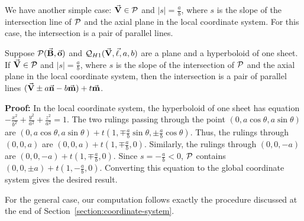      We have another simple case: $\vec{\bf V}\in{\cal P}$ and $|s|=\frac{a}{b}$,
where $s$ is the slope of the intersection line of ${\cal P}$ and the axial
plane in the local coordinate system.  For this case, the intersection is
a pair of parallel lines.

\begin{lemma}
\label{lemma:hy1-equal-slope}
     Suppose ${\cal P}(\vec{\bf B},\vec{\bf o})$ and
${\cal Q}_{H1}(\vec{\bf V},\vec{\bf \ell},a,b)$ are a plane and a hyperboloid of
one sheet.  If $\vec{\bf V}\in{\cal P}$ and $|s|=\frac{a}{b}$, where $s$ is the
slope of the intersection of ${\cal P}$ and the axial plane in the local
coordinate system, then the intersection is a pair of parallel lines
$(\vec{\bf V}\pm a\vec{\bf n}-b\vec{\bf m})+t\vec{\bf m}$.
\end{lemma}
{\bf Proof:}  In the local coordinate system, the hyperboloid of one sheet
has equation $-\frac{x^2}{b^2}+\frac{y^2}{a^2}+\frac{z^2}{a^2}=1$.
The two rulings passing through the point
$(0,a\cos\theta,a\sin\theta)$ are $(0,a\cos\theta,a\sin\theta)+t
\left(1,\mp\frac{a}{b}\sin\theta,\pm\frac{a}{b}\cos\theta\right)$.
Thus, the rulings through
$(0,0,a)$ are $(0,0,a)+t\left(1,\mp\frac{a}{b},0\right)$.  Similarly, the
rulings through $(0,0,-a)$ are $(0,0,-a)+t\left(1,\mp\frac{a}{b},0\right)$.
Since $s=-\frac{a}{b}<0$, ${\cal P}$ contains
$(0,0,\pm a)+t\left(1,-\frac{a}{b},0\right)$.  Converting this equation to
the global coordinate system gives the desired result. \QED

     For the general case, our computation follows exactly the procedure
discussed at the end of Section~\ref{section:coordinate-system}.

